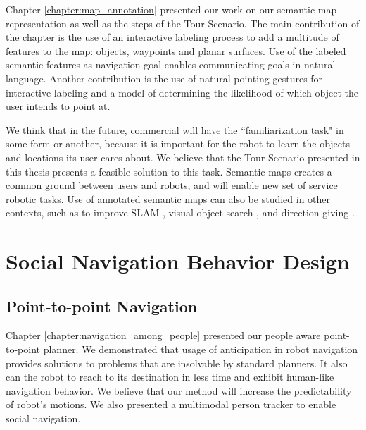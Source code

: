 Chapter \ref{chapter:map_annotation} presented our work on our semantic map representation as well as the steps of the Tour Scenario. The main contribution of the chapter is the use of an interactive labeling process to add a multitude of features to the map: objects, waypoints and planar surfaces. Use of the labeled semantic features as navigation goal enables communicating goals in natural language. Another contribution is the use of natural pointing gestures for interactive labeling and a model of determining the likelihood of which object the user intends to point at.

We think that in the future, commercial will have the ``familiarization task" in some form or another, because it is important for the robot to learn the objects and locations its user cares about. We believe that the Tour Scenario presented in this thesis presents a feasible solution to this task. Semantic maps creates a common ground between users and robots, and will enable new set of service robotic tasks. Use of annotated semantic maps can also be studied in other contexts, such as to improve SLAM \cite{trevor2015semantic}, visual object search \cite{rogers2013life},  and direction giving \cite{kollar2010toward}.






\section{Social Navigation Behavior Design}


\subsection{Point-to-point Navigation}

Chapter \ref{chapter:navigation_among_people} presented our people aware point-to-point planner. We demonstrated that usage of anticipation in robot navigation provides solutions to problems that are insolvable by standard planners. It also can the robot to
reach to its destination in less time and exhibit human-like navigation behavior. We believe that our method will increase the predictability of robot’s motions. We also presented a multimodal person tracker to enable social navigation.
	
